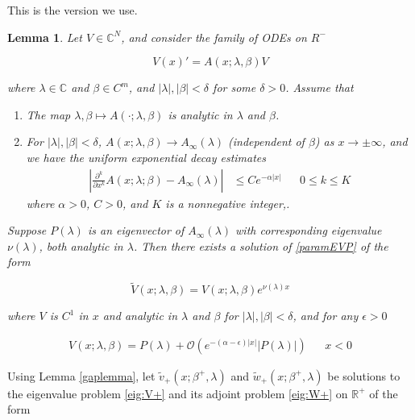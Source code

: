 \documentclass[12pt]{article}
\def\R{{\mathbb R}}
\def\C{{\mathbb C}}
\newtheorem{lemma}{Lemma}
\begin{document}

This is the version we use.

\begin{lemma}\label{gaplemma2}
Let $V \in \C^N$, and consider the family of ODEs on $R^-$

\begin{equation}\label{paramEVP}
V(x)' = A(x; \lambda, \beta) V
\end{equation}

where $\lambda \in \C$ and $\beta \in C^m$, and $|\lambda|, |\beta| < \delta$ for some $\delta > 0$. Assume that

\begin{enumerate}
	\item The map $\lambda, \beta \mapsto A(\cdot; \lambda, \beta)$ is analytic in $\lambda$ and $\beta$.
	\item For $|\lambda|, |\beta| < \delta$, $A(x; \lambda, \beta) \rightarrow A_\infty(\lambda)$ (independent of $\beta$) as $x \rightarrow \pm \infty$, and we have the uniform exponential decay estimates 
	\begin{align}
	\left| \frac{\partial^k}{\partial x^k} A(x; \lambda; \beta) - A_\infty(\lambda) \right| 
	&\leq C e^{-\alpha |x|} && 0 \leq k \leq K
	\end{align}
	where $\alpha > 0$, $C > 0$, and $K$ is a nonnegative integer,.
\end{enumerate}

Suppose $P(\lambda)$ is an eigenvector of $A_\infty(\lambda)$ with corresponding eigenvalue $\nu(\lambda)$, both analytic in $\lambda$. Then there exists a solution of \ref{paramEVP} of the form 

\begin{equation}
\tilde{V}(x; \lambda, \beta) = V(x; \lambda, \beta) e^{\nu(\lambda)x}
\end{equation}

where $V$ is $C^1$ in $x$ and analytic in $\lambda$ and $\beta$ for $|\lambda|, |\beta| < \delta$, and for any $\epsilon > 0$

\begin{align}
V(x; \lambda, \beta) = P(\lambda) + \mathcal{O}(e^{-(\alpha - \epsilon)|x|}|P(\lambda)|) && x < 0
\end{align}

\end{lemma}
 
Using Lemma \ref{gaplemma}, let $\tilde{v}_+(x; \beta^+, \lambda)$ and $\tilde{w}_+(x; \beta^+, \lambda)$ be solutions to the eigenvalue problem \eqref{eig:V+} and its adjoint problem \eqref{eig:W+} on $\R^+$ of the form 
\end{document}
